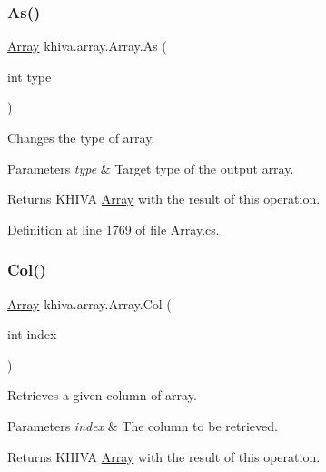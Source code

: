 \subsubsection{\texorpdfstring{As()}{As()}}
{\footnotesize\ttfamily \mbox{\hyperlink{classkhiva_1_1array_1_1_array}{Array}} khiva.\+array.\+Array.\+As (\begin{DoxyParamCaption}\item[{int}]{type }\end{DoxyParamCaption})\hspace{0.3cm}{\ttfamily [inline]}}



Changes the type of array. 


\begin{DoxyParams}{Parameters}
{\em type} & Target type of the output array.\\
\hline
\end{DoxyParams}
\begin{DoxyReturn}{Returns}
K\+H\+I\+VA \mbox{\hyperlink{classkhiva_1_1array_1_1_array}{Array}} with the result of this operation.
\end{DoxyReturn}


Definition at line 1769 of file Array.\+cs.

\mbox{\label{classkhiva_1_1array_1_1_array_ad5a1611739c07fa7dac698a8fa6dd388}} 
\subsubsection{\texorpdfstring{Col()}{Col()}}
{\footnotesize\ttfamily \mbox{\hyperlink{classkhiva_1_1array_1_1_array}{Array}} khiva.\+array.\+Array.\+Col (\begin{DoxyParamCaption}\item[{int}]{index }\end{DoxyParamCaption})\hspace{0.3cm}{\ttfamily [inline]}}



Retrieves a given column of array. 


\begin{DoxyParams}{Parameters}
{\em index} & The column to be retrieved.\\
\hline
\end{DoxyParams}
\begin{DoxyReturn}{Returns}
K\+H\+I\+VA \mbox{\hyperlink{classkhiva_1_1array_1_1_array}{Array}} with the result of this operation.
\end{DoxyReturn}


